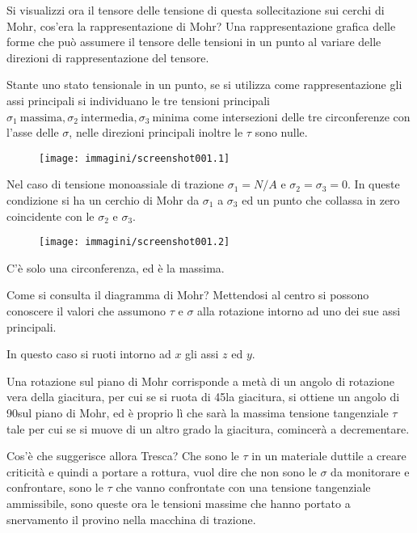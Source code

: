 \documentclass{article}
\begin{document}
\begin{adjustwidth}{2in}{}
	 	Si visualizzi ora il tensore delle tensione di questa sollecitazione sui cerchi di Mohr, cos'era la rappresentazione di Mohr? Una rappresentazione grafica delle forme che può assumere il tensore delle tensioni in un punto al variare delle direzioni di rappresentazione del tensore. 
	 	
	 	Stante uno stato tensionale in un punto, se si utilizza come rappresentazione gli assi principali si individuano le tre tensioni principali $\sigma_1 ~ \text{massima}, \sigma_2 ~ \text{intermedia}, \sigma_3 ~ \text{minima}$ come intersezioni delle tre circonferenze con l'asse delle $\sigma$, nelle direzioni principali inoltre le $\tau$ sono nulle. 
	 	
	 	\begin{figure}[H]
	 		\centering
	 		\texttt{[image: immagini/screenshot001.1]}
	 		\label{fig:screenshot001.1}
	 	\end{figure}
	 		 	
	 	Nel caso di tensione monoassiale di trazione $\sigma_1=N/A$ e $\sigma_2=\sigma_3=0$. In queste condizione si ha un cerchio di Mohr da $\sigma_1$ a $\sigma_3$ ed un punto che collassa in zero coincidente con le $\sigma_2$ e $\sigma_3$.
	 	
	 		 	\begin{figure}[H]
	 		\centering
	 		\texttt{[image: immagini/screenshot001.2]}
	 		\label{fig:screenshot001.2}
	 	\end{figure}
	 	
	 	C'è solo una circonferenza, ed è la massima. 
	 	
	 	Come si consulta il diagramma di Mohr? Mettendosi al centro si possono conoscere il valori che assumono $\tau$ e $\sigma$ alla rotazione intorno ad uno dei sue assi principali. 
	 	
	 	In questo caso si ruoti intorno ad $x$ gli assi $z$ ed $y$. 
	 	
	 	Una rotazione sul piano di Mohr corrisponde a metà di un angolo di rotazione vera della giacitura, per cui se si ruota di 45\degree la giacitura, si ottiene un angolo di 90\degree sul piano di Mohr, ed è proprio lì che sarà la massima tensione tangenziale $\tau$ tale per cui se si muove di un altro grado la giacitura, comincerà a decrementare. \newline
	 	
	 	Cos'è che suggerisce allora Tresca? Che sono le $\tau$ in un materiale duttile a creare criticità e quindi a portare a rottura, vuol dire che non sono le $\sigma$ da monitorare e confrontare, sono le $\tau$ che vanno confrontate con una tensione tangenziale ammissibile, sono queste ora le tensioni massime che hanno portato a snervamento il provino nella macchina di trazione. \newline 
	 	

\end{adjustwidth}
\end{document}
